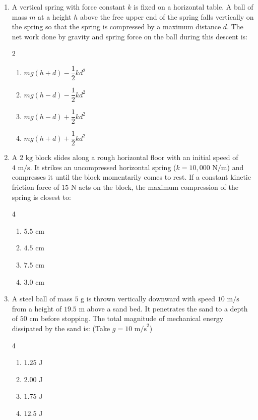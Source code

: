 \documentclass[11pt,a4paper]{article}
\begin{document}
\begin{enumerate}[label=\textbf{\arabic*.},leftmargin=18pt,itemsep=8pt,resume]
  \item A vertical spring with force constant $k$ is fixed on a horizontal table. A ball of mass $m$ at a height $h$ above the free upper end of the spring falls vertically on the spring so that the spring is compressed by a maximum distance $d$. The net work done by gravity and spring force on the ball during this descent is:
  \begin{multicols}{2}
    \begin{enumerate}[label=(\Alph*)]
      \item $mg(h + d) - \dfrac{1}{2}kd^2$
      \item $mg(h - d) - \dfrac{1}{2}kd^2$
      \item $mg(h - d) + \dfrac{1}{2}kd^2$
      \item $mg(h + d) + \dfrac{1}{2}kd^2$
    \end{enumerate}
  \end{multicols}

  \item A $2\text{ kg}$ block slides along a rough horizontal floor with an initial speed of $4\text{ m/s}$. It strikes an uncompressed horizontal spring ($k = 10{,}000\text{ N/m}$) and compresses it until the block momentarily comes to rest. If a constant kinetic friction force of $15\text{ N}$ acts on the block, the maximum compression of the spring is closest to:
  \begin{multicols}{4}
    \begin{enumerate}[label=(\Alph*)]
      \item $5.5\text{ cm}$
      \item $4.5\text{ cm}$
      \item $7.5\text{ cm}$
      \item $3.0\text{ cm}$
    \end{enumerate}
  \end{multicols}

  \item A steel ball of mass $5\text{ g}$ is thrown vertically downward with speed $10\text{ m/s}$ from a height of $19.5\text{ m}$ above a sand bed. It penetrates the sand to a depth of $50\text{ cm}$ before stopping. The total magnitude of mechanical energy dissipated by the sand is: (Take $g = 10\text{ m/s}^2$)
  \begin{multicols}{4}
    \begin{enumerate}[label=(\Alph*)]
      \item $1.25\text{ J}$
      \item $2.00\text{ J}$
      \item $1.75\text{ J}$
      \item $12.5\text{ J}$
    \end{enumerate}
  \end{multicols}


\end{enumerate}
\end{document}
